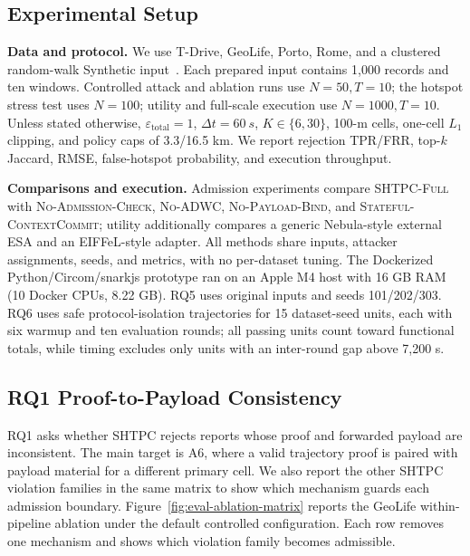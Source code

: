 \documentclass[journal]{IEEEtran}
\theoremstyle{definition}
\theoremstyle{plain}
\begin{document}
\subsection{Experimental Setup}
\label{sec:setup}

\noindent\textbf{Data and protocol.}
We use T-Drive, GeoLife, Porto, Rome, and a clustered random-walk Synthetic
input~\cite{Yuan2010Tdrive,Yuan2011Driving,Zheng2008Understanding,Zheng2009Mining,
Zheng2010GeoLife,MoreiraMatias2015Porto,Bracciale2014Rome}. Each prepared input
contains 1,000 records and ten windows. Controlled attack and ablation runs use
\(N=50,T=10\); the hotspot stress test uses \(N=100\); utility and full-scale
execution use \(N=1000,T=10\). Unless stated otherwise,
\(\varepsilon_{\mathrm{total}}=1\), \(\Delta t=\SI{60}{s}\),
\(K\in\{6,30\}\), 100-m cells, one-cell \(L_1\) clipping, and policy caps of
3.3/16.5 km. We report rejection TPR/FRR, top-\(k\) Jaccard, RMSE, false-hotspot
probability, and execution throughput.

\noindent\textbf{Comparisons and execution.}
Admission experiments compare \textsc{SHTPC-Full} with
\textsc{No-Admission-Check}, \textsc{No-ADWC}, \textsc{No-Payload-Bind}, and
\textsc{Stateful-ContextCommit}; utility additionally compares a generic
Nebula-style external ESA and an EIFFeL-style adapter. All methods share inputs, attacker assignments,
seeds, and metrics, with no per-dataset tuning. The Dockerized
Python/Circom/snarkjs prototype ran on an Apple M4 host with 16 GB RAM
(10 Docker CPUs, 8.22 GB). RQ5 uses original inputs and seeds 101/202/303. RQ6 uses safe
protocol-isolation trajectories for 15 dataset-seed units, each with six warmup
and ten evaluation rounds; all passing units count toward functional totals,
while timing excludes only units with an inter-round gap above 7,200 s.

\subsection{RQ1 Proof-to-Payload Consistency}
\label{sec:eval-headline}

RQ1 asks whether \textsc{SHTPC} rejects reports whose proof and forwarded
payload are inconsistent. The main target is A6, where a valid trajectory proof
is paired with payload material for a different primary cell. We also report
the other SHTPC violation families in the same matrix to show which mechanism
guards each admission boundary.
Figure~\ref{fig:eval-ablation-matrix} reports the GeoLife within-pipeline
ablation under the default controlled configuration. Each row removes one
mechanism and shows which violation family becomes admissible.
\end{document}
